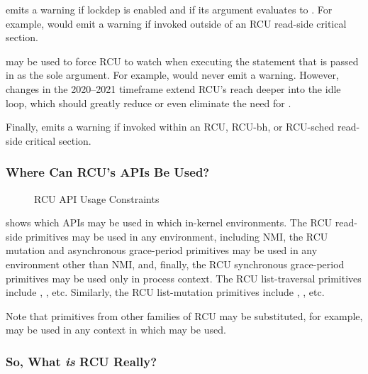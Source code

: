  emits a warning if lockdep is enabled and if
its argument evaluates to .
For example,  would emit a
warning if invoked outside of an RCU read-side critical section.

 may be used to force RCU to watch when executing
the statement that is passed in as the sole argument.
For example, 
would never emit a warning.
However, changes in the 2020--2021 timeframe extend RCU's reach deeper
into the idle loop, which should greatly reduce or even eliminate the
need for .

Finally,   emits a warning if invoked within
an RCU, RCU-bh, or RCU-sched read-side critical section.

\subsubsection{Where Can RCU's APIs Be Used?}
\label{sec:defer:Where Can RCU's APIs Be Used?}

\begin{figure}
\centering
{}
\caption{RCU API Usage Constraints}
\label{fig:defer:RCU API Usage Constraints}
\end{figure}

shows which APIs may be used in which in-kernel environments.
The RCU read-side primitives may be used in any environment, including NMI,
the RCU mutation and asynchronous grace-period primitives may be used in any
environment other than NMI, and, finally, the RCU synchronous grace-period
primitives may be used only in process context.
The RCU list-traversal primitives include ,
, etc.
Similarly, the RCU list-mutation primitives include
, , etc.

Note that primitives from other families of RCU may be substituted,
for example,  may be used in any context
in which  may be used.

\subsubsection{So, What \emph{is} RCU Really?}
\label{sec:defer:So; What is RCU Really?}

